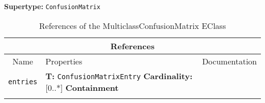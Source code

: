 \documentclass{article}
\begin{document}
\textbf{Supertype: }\texttt{ConfusionMatrix}
\begin{table}[H]
\footnotesize
\begin{tabularx}{\textwidth}{|c| p{4 cm} | X |}
\hline
\multicolumn{3}{|c|}{\textbf{References}} \\
\hline
Name & Properties & Documentation \\ \hline \hline
\texttt{entries}
 & 
\textbf{T:} \texttt{ConfusionMatrixEntry}
\newline
\textbf{Cardinality:} [0..*]
\newline
\textbf{Containment}
 & \\ \hline
\caption{References of the MulticlassConfusionMatrix EClass}
\end{tabularx}
\label{e4smMulticlassConfusionMatrixref}
\end{table}
\end{document}
